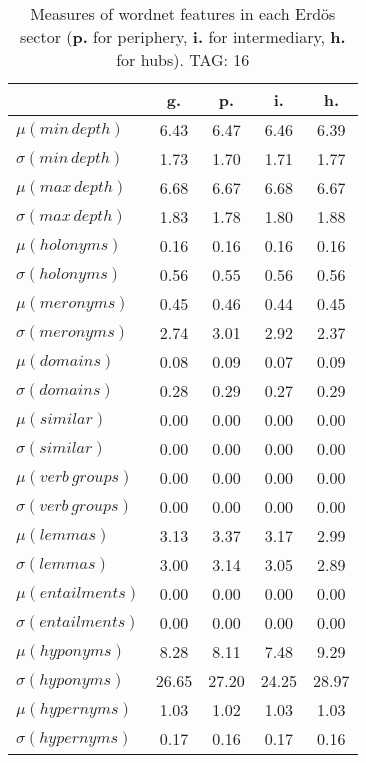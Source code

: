 \begin{table}[h!]
\begin{center}
\begin{tabular}{| l || c | c | c | c |}\hline
 & {\bf g.} & {\bf p.} & {\bf i.} & {\bf h.} \\\hline\hline
$\mu(min\,depth)$ & 6.43  & 6.47  & 6.46  & 6.39 \\
$\sigma(min\,depth)$ & 1.73  & 1.70  & 1.71  & 1.77 \\\hline
$\mu(max\,depth)$ & 6.68  & 6.67  & 6.68  & 6.67 \\
$\sigma(max\,depth)$ & 1.83  & 1.78  & 1.80  & 1.88 \\\hline
$\mu(holonyms)$ & 0.16  & 0.16  & 0.16  & 0.16 \\
$\sigma(holonyms)$ & 0.56  & 0.55  & 0.56  & 0.56 \\\hline
$\mu(meronyms)$ & 0.45  & 0.46  & 0.44  & 0.45 \\
$\sigma(meronyms)$ & 2.74  & 3.01  & 2.92  & 2.37 \\\hline
$\mu(domains)$ & 0.08  & 0.09  & 0.07  & 0.09 \\
$\sigma(domains)$ & 0.28  & 0.29  & 0.27  & 0.29 \\\hline
$\mu(similar)$ & 0.00  & 0.00  & 0.00  & 0.00 \\
$\sigma(similar)$ & 0.00  & 0.00  & 0.00  & 0.00 \\\hline
$\mu(verb\,groups)$ & 0.00  & 0.00  & 0.00  & 0.00 \\
$\sigma(verb\,groups)$ & 0.00  & 0.00  & 0.00  & 0.00 \\\hline
$\mu(lemmas)$ & 3.13  & 3.37  & 3.17  & 2.99 \\
$\sigma(lemmas)$ & 3.00  & 3.14  & 3.05  & 2.89 \\\hline
$\mu(entailments)$ & 0.00  & 0.00  & 0.00  & 0.00 \\
$\sigma(entailments)$ & 0.00  & 0.00  & 0.00  & 0.00 \\\hline
$\mu(hyponyms)$ & 8.28  & 8.11  & 7.48  & 9.29 \\
$\sigma(hyponyms)$ & 26.65  & 27.20  & 24.25  & 28.97 \\\hline
$\mu(hypernyms)$ & 1.03  & 1.02  & 1.03  & 1.03 \\
$\sigma(hypernyms)$ & 0.17  & 0.16  & 0.17  & 0.16 \\\hline
\end{tabular}
\caption{Measures of wordnet features in each Erd\"os sector ({{\bf p.}} for periphery, {{\bf i.}} for intermediary, {{\bf h.}} for hubs). TAG: 16}
\end{center}
\end{table}